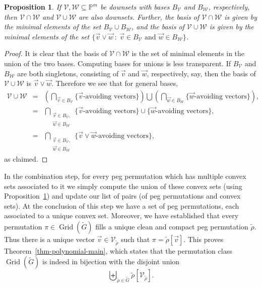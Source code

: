 \documentclass[10pt]{article}
\theoremstyle{plain}
\newtheorem{proposition}[theorem]{Proposition}
\theoremstyle{definition}
\newcommand{\V}{\mathcal{V}}
\newcommand{\W}{\mathcal{W}}
\newcommand{\Grid}{\operatorname{Grid}}
\newcommand{\st}{\::\:}
\begin{document}
\begin{proposition}
\label{prop-vector-union-intersection}
If $\V,\W\subseteq\mathbb{P}^m$ be downsets with bases $B_\V$ and $B_\W$, respectively, then $\V \cap \W$ and $\V \cup \W$ are also downsets. Further, the basis of $\V \cap \W$ is given by the minimal elements of the set $B_\V \cup B_\W$, and the basis of $\V \cup \W$ is given by the minimal elements of the set $ \{\vec{v}\vee\vec{w}\st\vec{v}\in B_\V\mbox{ and }\vec{w}\in B_\W\}$.
\end{proposition}
\begin{proof}
It is clear that the basis of $\V\cap\W$ is the set of minimal elements in the union of the two bases. Computing bases for unions is less transparent. If $B_\V$ and $B_\W$ are both singletons, consisting of $\vec{v}$ and $\vec{w}$, respectively, say, then the basis of $\V\cup\W$ is $\vec{v}\vee\vec{w}$. Therefore we see that for general bases,
\begin{eqnarray*}
\V\cup\W
&=&
\left(\bigcap_{\vec{v}\in B_\V} \{\mbox{$\vec{v}$-avoiding vectors}\}\right)
\bigcup
\left(\bigcap_{\vec{w}\in B_\W} \{\mbox{$\vec{w}$-avoiding vectors}\}\right),
\\
&=&
\bigcap_{\substack{\vec{v}\in B_\V,\\\vec{w}\in B_\W}}
\{\mbox{$\vec{v}$-avoiding vectors}\}\cup \{\mbox{$\vec{w}$-avoiding vectors}\},
\\
&=&
\bigcap_{\substack{\vec{v}\in B_\V,\\\vec{w}\in B_\W}}
\{\mbox{$\vec{v}\vee\vec{w}$-avoiding vectors}\},
\end{eqnarray*}
as claimed.
\end{proof}

In the combination step, for every peg permutation which has multiple convex sets associated to it we simply compute the union of these convex sets (using Proposition~\ref{prop-vector-union-intersection}) and update our list of pairs (of peg permutations and convex sets). At the conclusion of this step we have a set of peg permutations, each associated to a unique convex set. Moreover, we have established that every permutation $\pi\in\Grid({\tilde{G}})$ fills a unique clean and compact peg permutation $\tilde{\rho}$. Thus there is a unique vector $\vec{v}\in\mathcal{V}_{\tilde{\rho}}$ such that $\pi=\tilde{\rho}[\vec{v}]$. This proves Theorem~\ref{thm-polynomial-main}, which states that the permutation class $\Grid(\tilde{G})$ is indeed in bijection with the disjoint union
\[
	\biguplus_{\tilde{\rho}\in\tilde{G}} \tilde{\rho}[\mathcal{V}_{\tilde{\rho}}].
\]
\end{document}
